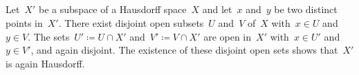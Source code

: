 \subsection{}

Let~$X'$ be a subspace of a Hausdorff space~$X$ and let~$x$ and~$y$ be two distinct points in~$X'$.
There exist disjoint open subsets~$U$ and~$V$ of~$X$ with~$x ∈ U$ and~$y ∈ V$.
The sets~$U' ≔ U ∩ X'$ and~$V' ≔ V ∩ X'$ are open in~$X'$ with~$x ∈ U'$ and~$y ∈ V'$, and again disjoint.
The existence of these disjoint open sets shows that~$X'$ is again Hausdorff.
